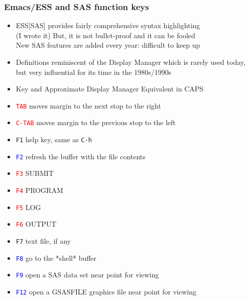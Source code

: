 \documentclass[11pt,pdftex,dvipsnames,usenames,helvetica]{beamer}
\begin{document}
\begin{frame}[fragile]
\frametitle{Emacs/ESS and SAS function keys}
\begin{itemize}
\item ESS[SAS] provides fairly comprehensive syntax highlighting\\
(I wrote it) But, it is not bullet-proof and it can be fooled\\
New SAS features are added every year: difficult to keep up\\
\item Definitions reminiscent of the Display Manager which is rarely used today,
but very influential for its time in the 1980s/1990s
\item Key and Approximate Display Manager Equivalent in CAPS
\item \textcolor{red}{\tt TAB} moves margin to the next stop to the right
\item \textcolor{red}{\tt C-TAB} moves margin to the previous stop to the left
\item {\tt F1} help key, same as {\tt C-h}
\item \textcolor{blue}{\tt F2} refresh the buffer with the file contents 
\item \textcolor{red}{\tt F3} SUBMIT 
\item \textcolor{red}{\tt F4} PROGRAM 
\item \textcolor{red}{\tt F5} LOG 
\item \textcolor{red}{\tt F6} OUTPUT 
\item {\tt F7} text file, if any 
\item \textcolor{blue}{\tt F8} go to the *shell* buffer 
\item \textcolor{blue}{\tt F9} open a SAS data set near point for viewing 
\item \textcolor{blue}{\tt F12} open a GSASFILE graphics file near point for viewing 
\end{itemize}
\end{frame}
\end{document}
